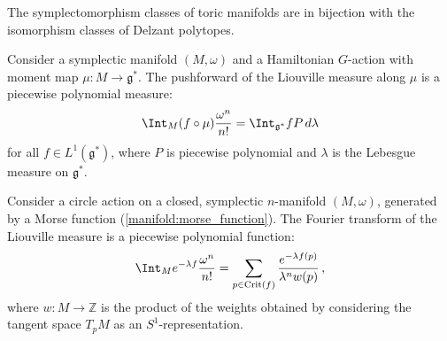     \begin{theorem}[Delzant]
        The symplectomorphism classes of toric manifolds are in bijection with the isomorphism classes of Delzant polytopes.
    \end{theorem}

    \begin{theorem}
        Consider a symplectic manifold $(M,\omega)$ and a Hamiltonian $G$-action with moment map $\mu:M\rightarrow\mathfrak{g}^*$. The pushforward of the Liouville measure along $\mu$ is a piecewise polynomial measure:
        \begin{gather}
            \Int_M (f\circ\mu)\frac{\omega^n}{n!} = \Int_{\mathfrak{g}^*}fP\,d\lambda
        \end{gather}
        for all $f\in L^1(\mathfrak{g}^*)$, where $P$ is piecewise polynomial and $\lambda$ is the Lebesgue measure on $\mathfrak{g}^*$.
    \end{theorem}
    \begin{result}[Localization]
        Consider a circle action on a closed, symplectic $n$-manifold $(M,\omega)$, generated by a Morse function (\cref{manifold:morse_function}). The Fourier transform of the Liouville measure is a piecewise polynomial function:
        \begin{gather}
            \Int_Me^{-\lambda f}\frac{\omega^n}{n!} = \sum_{p\in\mathrm{Crit}(f)}\frac{e^{-\lambda f(p)}}{\lambda^nw(p)}\,,
        \end{gather}
        where $w:M\rightarrow\mathbb{Z}$ is the product of the weights obtained by considering the tangent space $T_pM$ as an $S^1$-representation.
    \end{result}


